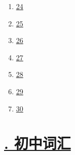 \documentclass[11pt]{article}
\begin{document}
\begin{multicols}{6}
\begin{enumerate}
		\item \href{https://mp.weixin.qq.com/s/2eXAI9iVAbKWJYo3v4zR0A}{24}	%
		\item \href{https://mp.weixin.qq.com/s/LcQaelsHk0it4Wx6akRNHw}{25}	%
		\item \href{https://mp.weixin.qq.com/s/GPVfEELg5VYoRQ5ceBwrmA}{26}	%
		\item \href{https://mp.weixin.qq.com/s/w2OCHBu05LNU1EIbsOf01Q}{27}	%
		\item \href{https://mp.weixin.qq.com/s/raQS9CMc8k2lsL1cfKZPGQ}{28}	%
		\item \href{https://mp.weixin.qq.com/s/Mk18gwL7epyYo47TDDoElg}{29}	%
		\item \href{https://mp.weixin.qq.com/s/KCppSGO5i8kbO-PEZoOPjg}{30}	%
	\end{enumerate}
\end{multicols}

\vspace{-0.5cm}

\section*{\normalfont \large  \href{https://www.youtube.com/playlist?list=PLmbmjB9I926YvSz7FtKsk425B7pNXuuur}{. 初中词汇} }

\vspace{-0.5cm}
\end{document}
